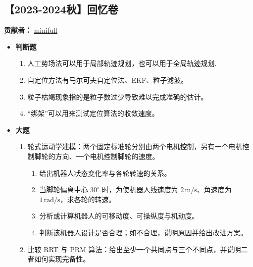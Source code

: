 \documentclass[../main.tex]{subfiles}
\begin{document}
\subsection{【2023-2024秋】回忆卷}
\textbf{贡献者：} \href{https://www.cc98.org/topic/5754671}{minifull}
\begin{itemize}
    \item \textbf{判断题}
    \begin{enumerate}
        \item 人工势场法可以用于局部轨迹规划，也可以用于全局轨迹规划.
        \\{\small\kaishu{\textcolor{blue}{√}}}
        \item 自定位方法有马尔可夫自定位法、EKF、粒子滤波。
        \\{\small\kaishu{\textcolor{blue}{× 马尔可夫定位法不是自定位的“求解”方法，而是EKF、PF等的本质原理。}}}
        \item 粒子枯竭现象指的是粒子数过少导致难以完成准确的估计。
        \\{\small\kaishu{\textcolor{blue}{× 是粒子重采样后集中到某些位置了，而粒子数保持不变。}}}
        \item “绑架”可以用来测试定位算法的收敛速度。
        \\{\small\kaishu{\textcolor{blue}{√}}}
    \end{enumerate}

    \item \textbf{大题}
    \begin{enumerate}
        \item 轮式运动学建模：两个固定标准轮分别由两个电机控制，另有一个电机控制脚轮的方向、一个电机控制脚轮的速度。
        \begin{enumerate}
            \item 给出机器人状态变化率与各轮转速的关系。
            \item 当脚轮偏离中心 $30^\circ$ 时，为使机器人线速度为 $2\,\mathrm{m/s}$、角速度为 $1\,\mathrm{rad/s}$，求各轮的转速。
            \item 分析或计算机器人的可移动度、可操纵度与机动度。
            \item 判断该机器人设计是否合理；如不合理，说明原因并给出改进方案。
        \end{enumerate}
        {\small\kaishu{\textcolor{blue}{机器人运动学建模，目前本课程已无此内容。}}}
        \item 比较 RRT 与 PRM 算法：给出至少一个共同点与三个不同点，并说明二者如何实现完备性。
        \\{\small{}}
\end{enumerate}
\end{itemize}
\end{document}
